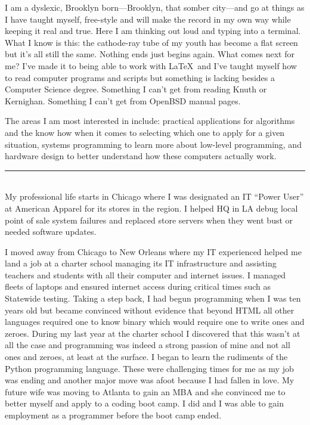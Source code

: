 \documentclass[12pt]{article}
\begin{document}
I am a dyslexic, Brooklyn born---Brooklyn, that somber city---and go at things as I have taught myself, free-style and will make the record in my own way while keeping it real and true.
Here I am thinking out loud and typing into a terminal. What I know is this: the cathode-ray tube of my youth has become a flat screen but it's all still the same. Nothing ends just begins again. What comes next for me? I've made it to being able to work with \LaTeX\ and I've taught myself how to read computer programs and scripts but something is lacking besides a Computer Science degree. Something I can't get from reading Knuth or Kernighan. Something I can't get from OpenBSD manual pages.

The areas I am most interested in include: practical applications for algorithms and the know how when it comes to selecting which one to apply for a given situation, systems programming to learn more about low-level programming, and hardware design to better understand how these computers actually work.\\

\hrule\
\\

My professional life starts in Chicago where I was designated an IT ``Power User'' at American Apparel for its stores in the region. I helped HQ in LA debug local point of sale system failures and replaced store servers when they went bust or needed software updates.

I moved away from Chicago to New Orleans where my IT experienced helped me land a job at a charter school managing its IT infrastructure and assisting teachers and students with all their computer and internet issues. I managed fleets of laptops and ensured internet access during critical times such as Statewide testing. Taking a step back, I had begun programming when I was ten years old but became convinced without evidence that beyond HTML all other languages required one to know binary which would require one to write ones and zeroes. During my last year at the charter school I discovered that this wasn't at all the case and programming was indeed a strong passion of mine and not all ones and zeroes, at least at the surface. I began to learn the rudiments of the Python programming language. These were challenging times for me as my job was ending and another major move was afoot because I had fallen in love. My future wife was moving to Atlanta to gain an MBA and she convinced me to better myself and apply to a coding boot camp. I did and I was able to gain employment as a programmer before the boot camp ended.
\end{document}
